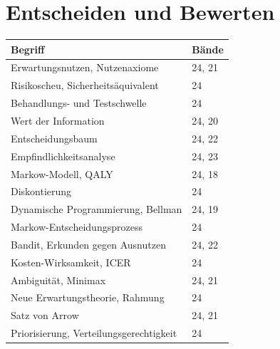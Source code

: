 \section*{Entscheiden und Bewerten}
\nopagebreak
{\small\renewcommand{\arraystretch}{1.32}
\begin{longtable}{@{}P{5.6cm}P{2.8cm}@{}}
\toprule
\textbf{Begriff} & \textbf{Bände}\\
\midrule
\endhead
Erwartungsnutzen, Nutzenaxiome & 24, 21\\
Risikoscheu, Sicherheitsäquivalent & 24\\
Behandlungs- und Testschwelle & 24\\
Wert der Information & 24, 20\\
Entscheidungsbaum & 24, 22\\
Empfindlichkeitsanalyse & 24, 23\\
Markow-Modell, QALY & 24, 18\\
Diskontierung & 24\\
Dynamische Programmierung, Bellman & 24, 19\\
Markow-Entscheidungsprozess & 24\\
Bandit, Erkunden gegen Ausnutzen & 24, 22\\
Kosten-Wirksamkeit, ICER & 24\\
Ambiguität, Minimax & 24, 21\\
Neue Erwartungstheorie, Rahmung & 24\\
Satz von Arrow & 24, 21\\
Priorisierung, Verteilungsgerechtigkeit & 24\\
\bottomrule
\end{longtable}}

